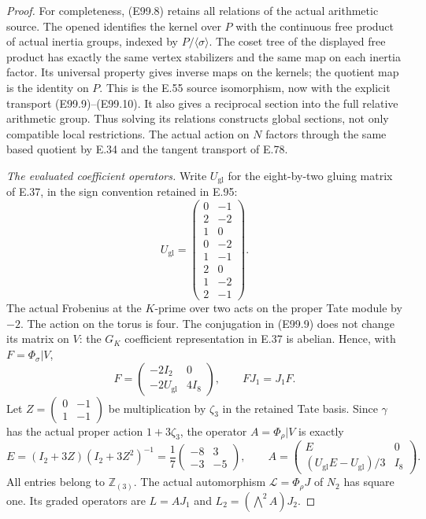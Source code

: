 \begin{proof}
For completeness, (E99.8) retains all relations of the
actual arithmetic source. The opened
\cite[Theorem2.4 and its proof, pp13--14]{E_WingbergRiemann}
identifies the kernel over $P$ with the continuous free
product of actual inertia groups, indexed by
$P/\langle\sigma\rangle$. The coset tree of the displayed
free product has exactly the same vertex stabilizers and
the same map on each inertia factor. Its universal property
gives inverse maps on the kernels; the quotient map is the
identity on $P$. This is the E.55 source isomorphism, now
with the explicit transport (E99.9)--(E99.10).
It also gives a reciprocal section into the full relative
arithmetic group. Thus solving its relations constructs
global sections, not only compatible local restrictions.
The actual action on $N$ factors through the same based
quotient by E.34 and the tangent transport of E.78.

\emph{The evaluated coefficient operators.}
Write $U_\mathrm{gl}$ for the eight-by-two gluing matrix
of E.37, in the sign convention retained in E.95:
\[
 U_\mathrm{gl}=
 \begin{pmatrix}
 0&-1\\2&-2\\1&0\\0&-2\\1&-1\\2&0\\1&-2\\2&-1
 \end{pmatrix}.
 \tag{E99.12}
\]
The actual Frobenius at the $K$-prime over two acts on the
proper Tate module by $-2$. The action on the torus is
four. The conjugation in (E99.9) does not change its matrix
on $V$: the $G_K$ coefficient representation in E.37 is
abelian. Hence, with $F=\Phi_\sigma|V$,
\[
 F=\begin{pmatrix}-2I_2&0\\-2U_\mathrm{gl}&4I_8\end{pmatrix},
 \qquad FJ_1=J_1F.
 \tag{E99.13}
\]
Let $Z=\left(\begin{smallmatrix}0&-1\\1&-1\end{smallmatrix}\right)$
be multiplication by $\zeta_3$ in the retained Tate basis.
Since $\gamma$ has the actual proper action $1+3\zeta_3$,
the operator $A=\Phi_\rho|V$ is exactly
\[
 E=(I_2+3Z)(I_2+3Z^2)^{-1}
    =\frac17\begin{pmatrix}-8&3\\-3&-5\end{pmatrix},
 \qquad
 A=\begin{pmatrix}E&0\\(U_\mathrm{gl}E-U_\mathrm{gl})/3&I_8\end{pmatrix}.
 \tag{E99.14}
\]
All entries belong to $\mathbb Z_{(3)}$.
The actual automorphism
$\mathcal L=\Phi_\rho J$ of $N_2$ has square one.
Its graded operators are $L=AJ_1$ and
$L_2=(\bigwedge^2A)J_2$.


\end{proof}
